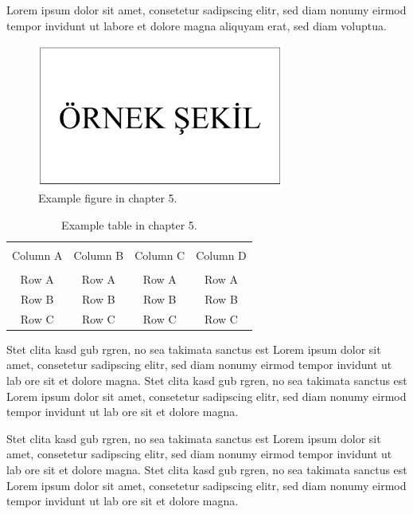 
Lorem ipsum dolor sit amet, consetetur sadipscing elitr, sed diam nonumy eirmod tempor invidunt ut labore et dolore magna aliquyam erat, sed diam voluptua.

\begin{figure}[h]
	\centering
	\includegraphics[width=230pt,keepaspectratio=true]{./fig/sekil5}
	\vspace{3mm}
	\caption{Example figure in chapter 5.}
	\label{Figure5.1}
\end{figure}

\begin{table}[h]
	{\setlength{\tabcolsep}{14pt}
		\caption{Example table in chapter 5.}
		\begin{center}
			\vspace{-6mm}
			\begin{tabular}{cccc}
			    \hline \\[-2.45ex] \hline \\[-2.1ex]
				Column A & Column B & Column C & Column D \\
				\hline \\[-1.8ex]
				Row A & Row A & Row A & Row A \\
				Row B & Row B & Row B & Row B \\
				Row C & Row C & Row C & Row C \\
				[-0ex] \hline
			\end{tabular}
			\vspace{-6mm}
		\end{center}
		\label{Table5.1}}
\end{table}

Stet clita kasd gub rgren, no sea takimata sanctus est Lorem ipsum dolor sit amet, consetetur sadipscing elitr, sed diam nonumy eirmod tempor invidunt ut lab ore sit et dolore magna. Stet clita kasd gub rgren, no sea takimata sanctus est Lorem ipsum dolor sit amet, consetetur sadipscing elitr, sed diam nonumy eirmod tempor invidunt ut lab ore sit et dolore magna.
 
Stet clita kasd gub rgren, no sea takimata sanctus est Lorem ipsum dolor sit amet, consetetur sadipscing elitr, sed diam nonumy eirmod tempor invidunt ut lab ore sit et dolore magna. Stet clita kasd gub rgren, no sea takimata sanctus est Lorem ipsum dolor sit amet, consetetur sadipscing elitr, sed diam nonumy eirmod tempor invidunt ut lab ore sit et dolore magna. 
